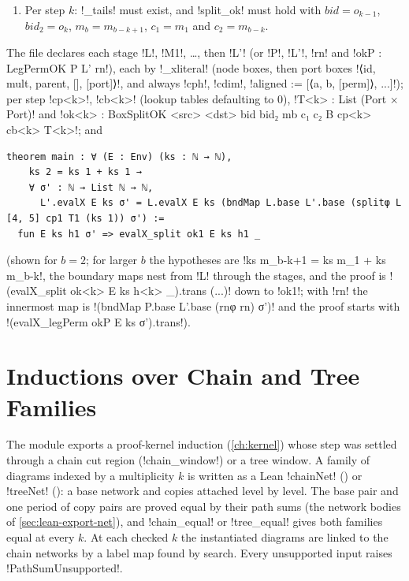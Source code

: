 {{{\begin{algorithm}
\begin{enumerate}
\lexpy!perm_ok(P, L', rn)! must hold.
\item Per step $k$: \lexpy!_tails! must exist, and \lexpy!split_ok! must hold with
$\mathit{bid} = o_{k-1}$, $\mathit{bid}_2 = o_k$, $m_b = m_{b-k+1}$, $c_1 = m_1$ and
$c_2 = m_{b-k}$.
\end{enumerate}
\end{algorithm}
The file declares each stage \lexlean!L!, \lexlean!M1!, \ldots, then \lexlean!L'! (or \lexlean!P!, \lexlean!L'!,
\lexlean!rn! and \lexlean!okP : LegPermOK P L' rn!), each by \lexpy!_xliteral! (node boxes, then port boxes
\lexlean!⟨id, mult, parent, [], [port]⟩!, and always \lexlean!cph!, \lexlean!cdim!,
\lexlean!aligned := [⟨a, b, [perm]⟩, ...]!); per step \lexlean!cp<k>!, \lexlean!cb<k>! (lookup tables
defaulting to 0), \lexlean!T<k> : List (Port × Port)! and
\lexlean!ok<k> : BoxSplitOK <src> <dst> bid bid₂ mb c₁ c₂ B cp<k> cb<k> T<k>!; and
\begin{lstlisting}[style=lexlean]
theorem main : ∀ (E : Env) (ks : ℕ → ℕ),
    ks 2 = ks 1 + ks 1 →
    ∀ σ' : ℕ → List ℕ → ℕ,
      L'.evalX E ks σ' = L.evalX E ks (bndMap L.base L'.base (splitφ L [4, 5] cp1 T1 (ks 1)) σ') :=
  fun E ks h1 σ' => evalX_split ok1 E ks h1 _
\end{lstlisting}
(shown for $b=2$; for larger $b$ the hypotheses are \lexlean!ks m_{b-k+1} = ks m_1 + ks m_{b-k}!,
the boundary maps nest from \lexlean!L! through the stages, and the proof is
\lexlean!(evalX_split ok<k> E ks h<k> _).trans (...)! down to \lexlean!ok1!; with \lexcode!rn! the innermost
map is \lexlean!(bndMap P.base L'.base (rnφ rn) σ')! and the proof starts with
\lexlean!(evalX_legPerm okP E ks σ').trans!).

\section{Inductions over Chain and Tree Families}\label{sec:lean-export-chain}

The module  exports a proof-kernel induction
(\cref{ch:kernel}) whose step was settled through a chain cut region (\lexcode!chain_window!) or a
tree window. A family of diagrams indexed by a multiplicity $k$ is written as a Lean
\lexlean!chainNet! () or \lexlean!treeNet!
(): a base network and copies attached level by level. The
base pair and one period of copy pairs are proved equal by their path sums (the network bodies of
\cref{sec:lean-export-net}), and \lexlean!chain_equal! or \lexlean!tree_equal! gives both families
equal at every $k$. At each checked $k$ the instantiated diagrams are linked to the chain
networks by a label map found by search. Every unsupported input raises
\lexpy!PathSumUnsupported!.

}}}
